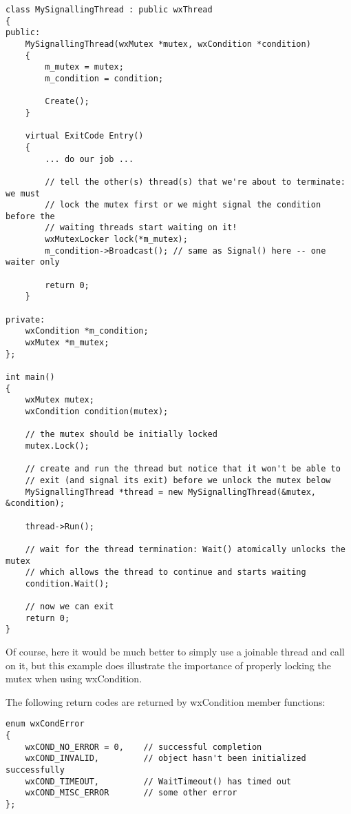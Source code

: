 \begin{verbatim}
class MySignallingThread : public wxThread
{
public:
    MySignallingThread(wxMutex *mutex, wxCondition *condition)
    {
        m_mutex = mutex;
        m_condition = condition;

        Create();
    }

    virtual ExitCode Entry()
    {
        ... do our job ...

        // tell the other(s) thread(s) that we're about to terminate: we must
        // lock the mutex first or we might signal the condition before the
        // waiting threads start waiting on it!
        wxMutexLocker lock(*m_mutex);
        m_condition->Broadcast(); // same as Signal() here -- one waiter only

        return 0;
    }

private:
    wxCondition *m_condition;
    wxMutex *m_mutex;
};

int main()
{
    wxMutex mutex;
    wxCondition condition(mutex);

    // the mutex should be initially locked
    mutex.Lock();

    // create and run the thread but notice that it won't be able to
    // exit (and signal its exit) before we unlock the mutex below
    MySignallingThread *thread = new MySignallingThread(&mutex, &condition);

    thread->Run();

    // wait for the thread termination: Wait() atomically unlocks the mutex
    // which allows the thread to continue and starts waiting
    condition.Wait();

    // now we can exit
    return 0;
}
\end{verbatim}

Of course, here it would be much better to simply use a joinable thread and
call  on it, but this example does
illustrate the importance of properly locking the mutex when using
wxCondition.


The following return codes are returned by wxCondition member functions:

\begin{verbatim}
enum wxCondError
{
    wxCOND_NO_ERROR = 0,    // successful completion
    wxCOND_INVALID,         // object hasn't been initialized successfully
    wxCOND_TIMEOUT,         // WaitTimeout() has timed out
    wxCOND_MISC_ERROR       // some other error
};
\end{verbatim}


